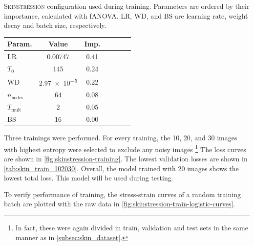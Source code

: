 \begin{margintable}
    \centering
    \caption[\textsc{Skinstression} configuration]{
        \textsc{Skinstression} configuration used during training.
        Parameters are ordered by their importance, calculated with fANOVA.
        LR, WD, and BS are learning rate, weight decay and batch size, respectively.
    }
    \label{tab:conf_skin_final}
    \begin{tabular}{l c c c c c c}
        \toprule
        Param.               & Value         & Imp. \\
        \midrule
        {LR}                 & 0.00747       & 0.41 \\
        {$T_0$}              & 145           & 0.24 \\
        {WD}                 & \num{2.97e-5} & 0.22 \\
        {$n_\mathrm{nodes}$} & 64            & 0.08 \\
        {$T_\mathrm{mult}$}  & 2             & 0.05 \\
        {BS}                 & 16            & 0.00 \\
        \bottomrule
    \end{tabular}
\end{margintable}

Three trainings were performed.
For every training, the 10, 20, and 30 images with highest entropy were selected to exclude any noisy images
\footnote{In fact, these were again divided in train, validation and test sets in the same manner as in \cref{subsec:skin_dataset}.}
The loss curves are shown in \cref{fig:skinstression-training}.
The lowest validation losses are shown in \cref{tab:skin_train_102030}.
Overall, the model trained with 20 images shows the lowest total loss.
This model will be used during testing.

To verify performance of training, the stress-strain curves of a random training batch are plotted with the raw data in \cref{fig:skinstression-train-logistic-curves}.


